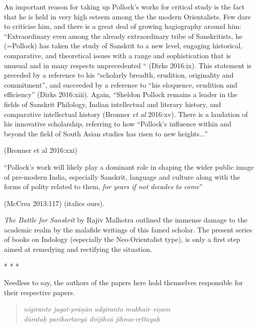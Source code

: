 \begin{myquote}
An important reason for taking up Pollock’s works for critical study is the fact that he is held in very high esteem among the the modern Orientalists. Few dare to criticise him, and there is a great deal of growing hagiography around him: “Extraordinary even among the already extraordinary tribe of Sanskritists, he (=Pollock) has taken the study of Sanskrit to a new level, engaging historical, comparative, and theoretical issues with a range and sophistication that is unusual and in many respects unprecedented “ (Dirks 2016:ix). This statement is preceded by a reference to his “scholarly breadth, erudition, originality and commitment”, and succeeded by a reference to “his eloquence, erudition and efficiency” (Dirks 2016:xiii). Again, “Sheldon Pollock remains a leader in the fields of Sanskrit Philology, Indian intellectual and literary history, and comparative intellectual history (Bronner \textit{et al} 2016:xv). There is a laudation of his innovative scholarship, referring to how “Pollock’s influence within and beyond the field of South Asian studies has risen to new heights...”
\end{myquote}

\vskip -5pt

\hfill (Bronner et al 2016:xxi)

\begin{myquote}
“Pollock’s work will likely play a dominant role in shaping the wider public image of pre-modern India, especially Sanskrit, language and culture along with the forms of polity related to them, \textit{for years if not decades to come}” 
\end{myquote}

\hfill (McCrea 2013:117) (italics ours).

\textit{The Battle for Sanskrit} by Rajiv Malhotra outlined the immense damage to the academic realm by the malafide writings of this famed scholar. The present series of books on Indology (especially the Neo-Orientalist type), is only a first step aimed at remedying and rectifying the situation.

\begin{center}
* * *
\end{center}

Needless to say, the authors of the papers here hold themselves responsible for their respective papers.

\begin{verse}
\textit{nigiranto jagat-prāṇān udgiranto mukhair viṣam}  \\\textit{dūrataḥ parihartavyā dvijihvā jihma-vṛttayaḥ} 
\end{verse}

